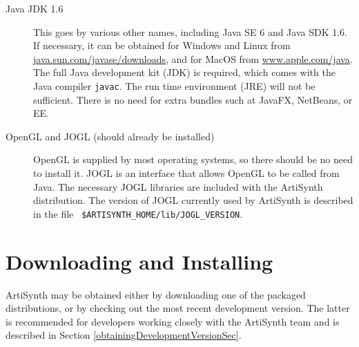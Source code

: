 \documentclass{article}
\begin{document}
\begin{description}

\item[Java JDK 1.6]\mbox{}

This goes by various other names, including Java
SE 6 and Java SDK 1.6. If necessary, it can be obtained for Windows
and Linux from
\href{http://java.sun.com/javase/downloads}{java.sun.com/javase/downloads},
and for MacOS from
\href{http://www.apple.com/java}{www.apple.com/java}. The full Java
development kit (JDK) is required, which comes with the Java compiler
{\tt javac}. The run time environment (JRE) will not be
sufficient. There is no need for extra bundles such at JavaFX,
NetBeans, or EE.


\item[OpenGL and JOGL (should already be installed)]\mbox{}

OpenGL is supplied by most operating systems, so there should be no
need to install it. JOGL is an interface that allows OpenGL to be
called from Java. The necessary JOGL libraries are included with the
ArtiSynth distribution. The version of JOGL currently used by
ArtiSynth is described in the file {\tt
\$ARTISYNTH\_HOME/lib/JOGL\_VERSION}.


\end{description}


\section{Downloading and Installing}
\label{DownloadingSec}

ArtiSynth may be obtained either by downloading one of the packaged
distributions, or by checking out the most recent development version.
The latter is recommended for developers working
closely with the ArtiSynth team and is described in
Section \ref{obtainingDevelopmentVersionSec}.
\end{document}
